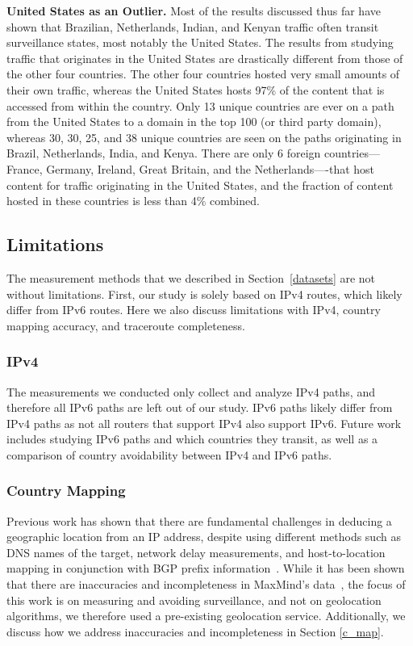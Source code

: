 {\bf United States as an Outlier.}
Most of the results discussed thus far have shown that Brazilian, Netherlands, Indian, and Kenyan traffic often transit surveillance states, most notably the United States.  The results from studying traffic that originates in the United States are drastically different from those of the other four countries.  The other four countries hosted very small amounts of their own traffic, whereas the United States hosts 97\% of the content that is accessed from within the country.  Only 13 unique countries are ever on a path from the United States to a domain in the top 100 (or third party domain), whereas 30, 30, 25, and 38 unique countries are seen on the paths originating in Brazil, Netherlands, India, and Kenya.  There are only 6 foreign countries---France, Germany, Ireland, Great Britain, and the Netherlands----that host content for traffic originating in the United States, and the fraction of content hosted in these countries is less than 4\% combined.

\subsection{Limitations}
The measurement methods that we described in Section~\ref{datasets} are not without limitations.  First, our study is solely based on IPv4 routes, which likely differ from IPv6 routes.  Here we also discuss limitations with IPv4, country mapping accuracy, and traceroute completeness.

\subsubsection{IPv4}
The measurements we conducted only collect and analyze IPv4 paths, and therefore all IPv6 paths are left out of our study.  IPv6 paths likely differ from IPv4 paths as not all routers that support IPv4 also support IPv6.  Future work includes studying IPv6 paths and which countries they transit, as well as a comparison of country avoidability between IPv4 and IPv6 paths. 

\subsubsection{Country Mapping}
Previous work has shown that there are fundamental challenges in deducing a geographic location from an IP address, despite using different methods such as DNS names of the target, network delay measurements, and host-to-location mapping in conjunction with BGP prefix information~\cite{padmanabhan2001investigation}.  While it has been shown that there are inaccuracies and incompleteness in MaxMind's data~\cite{huffaker2011geocompare}, the focus of this work is on measuring and avoiding surveillance, and not on geolocation algorithms, we therefore used a pre-existing geolocation service. Additionally, we discuss how we address inaccuracies and incompleteness in Section \ref{c_map}.

